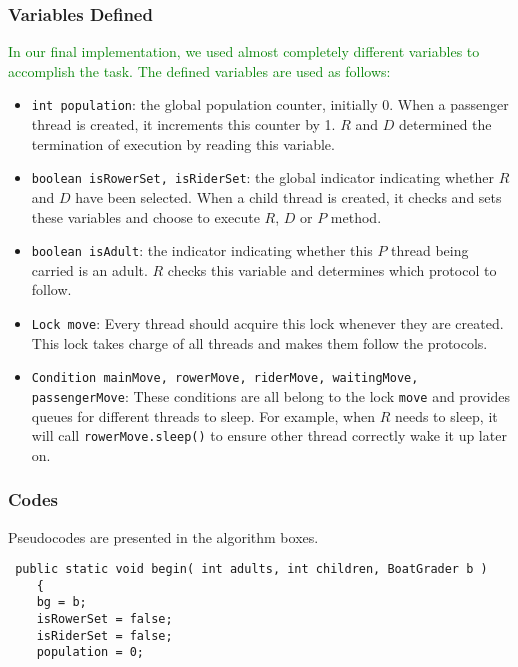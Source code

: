 \documentclass{article}
\begin{document}
\begin{spacing}{1.1}
\subsubsection{Variables Defined}
\textcolor{green}{In our final implementation, we used almost completely different variables to accomplish the task. The defined variables are used as follows:}
\begin{itemize}
  \item \texttt{int population}: the global population counter, initially 0. When a passenger thread is created, it increments this counter by 1. $R$ and $D$ determined the termination of execution by reading this variable.\\
  \item \texttt{boolean isRowerSet, isRiderSet}: the global indicator indicating whether $R$ and $D$ have been selected. When a child thread is created, it checks and sets these variables and choose to execute $R$, $D$ or $P$ method.\\
  \item \texttt{boolean isAdult}: the indicator indicating whether this $P$ thread being carried is an adult. $R$ checks this variable and determines which protocol to follow.\\
  \item \texttt{Lock move}: Every thread should acquire this lock whenever they are created. This lock takes charge of all threads and makes them follow the protocols.\\
  \item \texttt{Condition mainMove, rowerMove, riderMove, waitingMove, passengerMove}: These conditions are all belong to the lock \texttt{move} and provides queues for different threads to sleep. For example, when $R$ needs to sleep, it will call \texttt{rowerMove.sleep()} to ensure other thread correctly wake it up later on.\\
\end{itemize}

\subsubsection{Codes}
Pseudocodes are presented in the algorithm boxes.\\

\begin{lstlisting}
 public static void begin( int adults, int children, BoatGrader b )
    {
	bg = b;
	isRowerSet = false;
	isRiderSet = false;
	population = 0;
	

\end{lstlisting}
\end{spacing}
\end{document}
